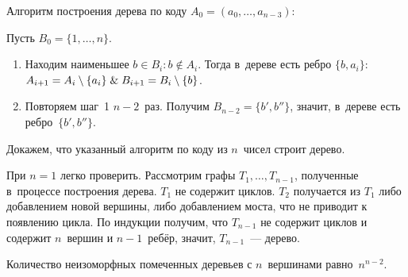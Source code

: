 Алгоритм построения дерева по коду $A_0 = (a_0, \ldots, a_{n-3})$:

Пусть $B_0 = \{ 1, \ldots, n \}$.
\begin{enumerate}
	\item Находим наименьшее $b \in B_i \colon b \notin A_i$.
	Тогда в~дереве есть ребро $\{ b, a_i \}$: $A_{i+1} = A_i \setminus \{ a_i \} \mathrel{\&} B_{i+1} = B_i \setminus \{ b \}$.
	\item Повторяем шаг~1 $n - 2$~раз.
	Получим $B_{n-2} = \{ b', b'' \}$, значит, в~дереве есть ребро~$\{ b', b'' \}$.
\end{enumerate}

Докажем, что указанный алгоритм по коду из $n$~чисел строит дерево.
\begin{proofmathind}
	\indbase При $n = 1$ легко проверить.
	\indstep Рассмотрим графы $T_1, \ldots, T_{n-1}$, полученные в~процессе построения дерева.
	$T_1$ не содержит циклов.
	$T_2$ получается из $T_1$ либо добавлением новой вершины, либо добавлением моста, что не приводит к появлению цикла.	
	По индукции получим, что $T_{n-1}$ не содержит циклов и содержит $n$~вершин и $n - 1$~ребёр, значит, $T_{n-1}$~--- дерево.
	\indend
\end{proofmathind}

\begin{theorem}[Кэли]
Количество неизоморфных помеченных деревьев с $n$~вершинами равно~$n^{n-2}$.
\end{theorem}